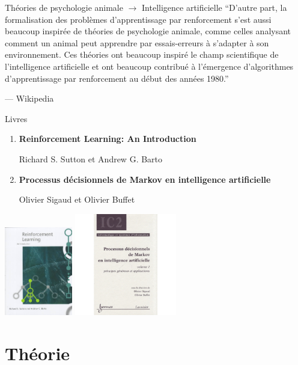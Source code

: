 \documentclass{beamer}
\begin{document}
\begin{frame}{Théories de psychologie animale $\to$ Intelligence artificielle }
  ``D'autre part, la formalisation des problèmes d'apprentissage par
  renforcement s'est aussi beaucoup inspirée de théories de
  psychologie animale, comme celles analysant comment un animal peut
  apprendre par essais-erreurs à s'adapter à son environnement. Ces
  théories ont beaucoup inspiré le champ scientifique de
  l'intelligence artificielle et ont beaucoup contribué à l'émergence
  d'algorithmes d'apprentissage par renforcement au début des années
  1980.''

  \hfill \scriptsize --- Wikipedia
\end{frame}


\begin{frame}{Livres}

\begin{enumerate}
\item {\bf Reinforcement Learning: An Introduction}

Richard S. Sutton et Andrew G. Barto

\item {\bf Processus décisionnels de Markov en intelligence artificielle}

Olivier Sigaud et  Olivier Buffet
\end{enumerate}


\begin{center}
\includegraphics[width=8em]{figs/rl-book.jpeg}
\includegraphics[width=12em]{figs/book21.jpg}
\end{center}
\end{frame}


\section{Théorie}
\end{document}
